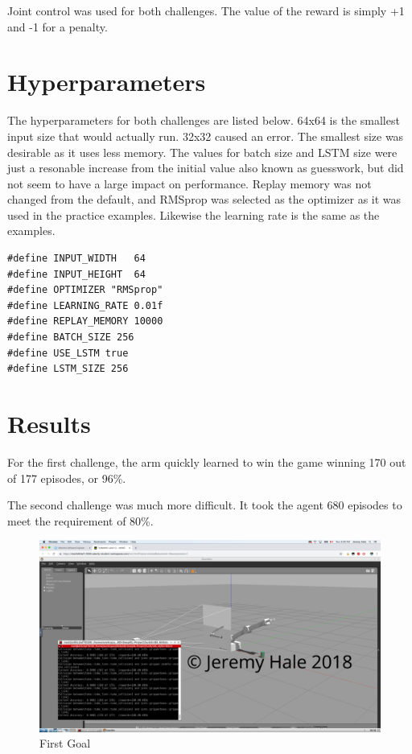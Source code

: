 \documentclass[10pt,journal,compsoc]{IEEEtran}
\begin{document}
Joint control was used for both challenges.
The value of the reward is simply +1 and -1 for a penalty.

\section{Hyperparameters}
The hyperparameters for both challenges are listed below. 64x64 is the smallest input size that would actually run. 32x32 caused an error. The smallest size was desirable as it uses less memory. The values for batch size and LSTM size were just a resonable increase from the initial value also known as guesswork, but did not seem to have a large impact on performance. Replay memory was not changed from the default, and RMSprop was selected as the optimizer as it was used in the practice examples. Likewise the learning rate is the same as the examples.

\begin{lstlisting}
#define INPUT_WIDTH   64
#define INPUT_HEIGHT  64
#define OPTIMIZER "RMSprop"
#define LEARNING_RATE 0.01f
#define REPLAY_MEMORY 10000
#define BATCH_SIZE 256
#define USE_LSTM true
#define LSTM_SIZE 256

\end{lstlisting}

\section{Results}

For the first challenge, the arm quickly learned to win the game winning 170 out of 177 episodes, or 96\%.

The second challenge was much more difficult. It took the agent 680 episodes to meet the requirement of 80\%.

\begin{figure}[thpb]
    \centering
    \includegraphics[width=\linewidth]{goal1_water}
    \caption{First Goal}
    \label{fig:first_goal}
\end{figure}
\end{document}
